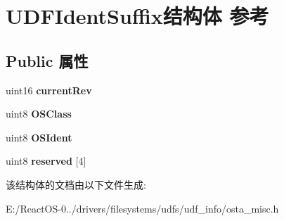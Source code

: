 \hypertarget{struct_u_d_f_ident_suffix}{}\section{U\+D\+F\+Ident\+Suffix结构体 参考}
\label{struct_u_d_f_ident_suffix}
\subsection*{Public 属性}
\begin{DoxyCompactItemize}
\item 
\mbox{\label{struct_u_d_f_ident_suffix_ac958fe77ef43af70e19111887f05e008}} 
uint16 {\bfseries current\+Rev}
\item 
\mbox{\label{struct_u_d_f_ident_suffix_a55401f177de563d2bae9e3c8b3e04fd5}} 
uint8 {\bfseries O\+S\+Class}
\item 
\mbox{\label{struct_u_d_f_ident_suffix_aa47c22cacc39ee476832ba0b0d3e7a00}} 
uint8 {\bfseries O\+S\+Ident}
\item 
\mbox{\label{struct_u_d_f_ident_suffix_ac3eacd38670cd4b9d21f8812d8f1bac7}} 
uint8 {\bfseries reserved} \mbox{[}4\mbox{]}
\end{DoxyCompactItemize}


该结构体的文档由以下文件生成\+:\begin{DoxyCompactItemize}
\item 
E\+:/\+React\+O\+S-\/0../drivers/filesystems/udfs/udf\+\_\+info/osta\+\_\+misc.\+h\end{DoxyCompactItemize}
